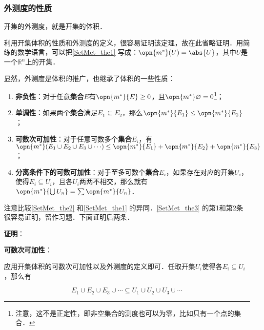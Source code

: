 \subsubsection{外测度的性质}

\begin{theorem}{}\label{SetMet_the1}
开集的外测度，就是开集的体积．
\end{theorem}

利用开集体积的性质和外测度的定义，很容易证明该定理，故在此省略证明．用简练的数学语言，可以把\autoref{SetMet_the1} 写成：$\opn{m^*}(U)=\abs{U}$，其中$U$是一个$\mathbb{R}^n$上的开集．

显然，外测度是体积的推广，也继承了体积的一些性质：

\begin{theorem}{}\label{SetMet_the3}
\begin{enumerate}
\item \textbf{非负性}：对于任意\textbf{集合}$E$有$\opn{m^*}{E}\geq 0$，且$\opn{m^*}\varnothing=0$\footnote{注意，这不是正定性，即非空集合的测度也可以为零，比如只有一个点的集合．}；\\
\item \textbf{单调性}：如果两个\textbf{集合}满足$E_1\subseteq E_2$，那么$\opn{m^*}{E_1}\leq \opn{m^*}{E_2}$；\\
\item \textbf{可数次可加性}：对于任意可数多个\textbf{集合}$E_i$，有$\opn{m^*}({E_1\cup E_2\cup E_3\cup \cdots})\leq \opn{m^*}{E_1}+\opn{m^*}{E_2}+\opn{m^*}{E_3}$；\\
\item \textbf{分离条件下的可数可加性}：对于至多可数个\textbf{集合}$E_i$，如果存在对应的开集$U_i$，使得$E_i\subseteq U_i$，且各$U_i$两两不相交，那么就有$\opn{m^*}{\bigcup U_n}=\sum\opn{m^*}{U_n}$．
\end{enumerate}
\end{theorem}

注意比较\autoref{SetMet_the2} 和\autoref{SetMet_the1} 的异同．\autoref{SetMet_the3} 的第1和第2条很容易证明，留作习题．下面证明后两条．

\textbf{证明}：

\textbf{可数次可加性}：

应用开集体积的可数次可加性以及外测度的定义即可．任取开集$U_i$使得各$E_i\subseteq U_i$，那么有

\begin{equation}
E_1\cup E_2\cup E_3\cup \cdots \subseteq U_1\cup U_2\cup U_3\cup \cdots
\end{equation}

